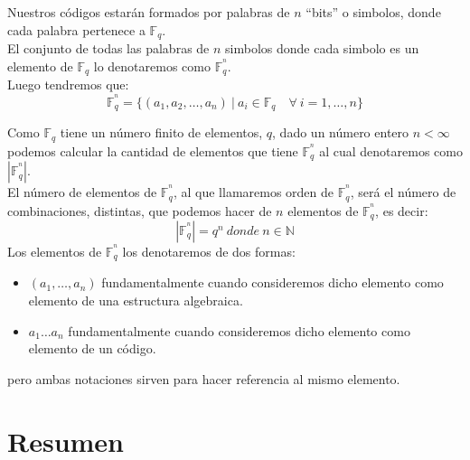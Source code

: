 Nuestros c\'odigos estar\'an formados por palabras de $n$ ``bits'' o simbolos,
donde cada palabra pertenece a $\mathbb{F}_q$.\\

El conjunto de todas las palabras de $n$ simbolos donde cada simbolo es un
elemento de $\mathbb{F}_q$ lo denotaremos como $\mathbb{F}^{^n}_q$.\\

Luego tendremos que:
\begin{displaymath}
\mathbb{F}^{^n}_q = \{(a_1,a_2,\dots,a_n)\ |\ a_i\in \mathbb{F}_q\quad \forall \
i=1,\dots,n\}
\end{displaymath}

Como $\mathbb{F}_q$ tiene un n\'umero finito de elementos, $q$, dado un n\'umero
entero $n<\infty$ podemos calcular la cantidad de elementos que tiene
$\mathbb{F}^{^n}_q$ al cual denotaremos como $|\mathbb{F}^{^n}_q|$.\\

El n\'umero de elementos de $\mathbb{F}^{^n}_q$, al que llamaremos orden de
$\mathbb{F}^{^n}_q$, ser\'a el n\'umero de combinaciones, distintas, que podemos
hacer de $n$ elementos de $\mathbb{F}^{^n}_q$, es decir:
\begin{displaymath}
|\mathbb{F}^{^n}_q| = q^n\ donde\ n\in \mathbb{N}
\end{displaymath}
%
Los elementos de $\mathbb{F}^{^n}_q$ los denotaremos de dos formas:
\begin{itemize}
\item $(a_1,\dots,a_n)$ fundamentalmente cuando consideremos dicho elemento como
elemento de una estructura algebraica.
\item $a_1\dots a_n$ fundamentalmente cuando consideremos dicho elemento como
elemento de un c\'odigo.
\end{itemize}
pero ambas notaciones sirven para hacer referencia al mismo elemento.

\section{Resumen}

